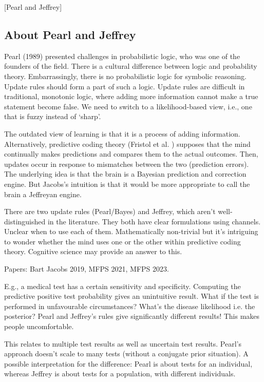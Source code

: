 [Pearl and Jeffrey]

\begin{affils}
\end{affils}

\subsection*{About Pearl and Jeffrey}

Pearl (1989) presented challenges in probabilistic logic, who was one of the founders
of the field.
There is a cultural difference between logic and probability theory.
Embarrassingly, there is no probabilistic logic for symbolic reasoning.
Update rules should form a part of such a logic.
Update rules are difficult in traditional, monotonic logic, where adding more
information cannot make a true statement become false.
We need to switch to a likelihood-based view, i.e., one that is fuzzy instead of
`sharp'.

The outdated view of learning is that it is a process of adding information.
Alternatively, predictive coding theory (Fristol et al.
) supposes that the mind continually
makes predictions and compares them to the actual outcomes.
Then, updates occur in response to mismatches between the two (prediction errors).
The underlying idea is that the brain is a Bayesian prediction and correction engine.
But Jacobs's intuition is that it would be more appropriate to call the brain a
Jeffreyan engine.

There are two update rules (Pearl/Bayes) and Jeffrey, which aren't well-distinguished
in the literature.
They both have clear formulations using channels.
Unclear when to use each of them.
Mathematically non-trivial but it's intriguing to wonder whether the mind uses one or
the other within predictive coding theory.
Cognitive science may provide an answer to this.

Papers: Bart Jacobs 2019, MFPS 2021, MFPS 2023.

E.g., a medical test has a certain sensitivity and specificity.
Computing the predictive positive test probability gives an unintuitive result.
What if the test is performed in unfavourable circumstances?
What's the disease likelihood i.e. the posterior?
Pearl and Jeffrey's rules give significantly different results!
This makes people uncomfortable.

This relates to multiple test results as well as uncertain test results.
Pearl's approach doesn't scale to many tests (without a conjugate prior situation).
A possible interpretation for the difference: Pearl is about tests for an individual,
whereas Jeffrey is about tests for a population, with different individuals.

